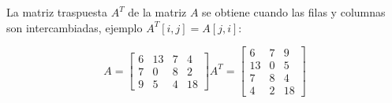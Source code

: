 
La matriz traspuesta $A^T$ de la matriz $A$ se obtiene cuando las filas y columnas son intercambiadas, ejemplo $A^T[i,j] = A[j,i]$:


$$
A = \begin{bmatrix}
	6	& 13 & 7 & 4 \\
	7	& 0 & 8 & 2 \\
	9	& 5 & 4 & 18
\end{bmatrix}   
A^T = \begin{bmatrix}
6	& 7 & 9  \\
13	& 0 & 5  \\
7	& 8 & 4  \\
4	& 2 & 18
\end{bmatrix}$$